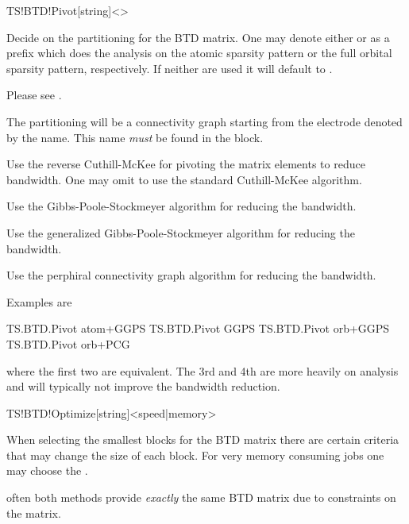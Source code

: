 \begin{fdfentry}{TS!BTD!Pivot}[string]<>

  Decide on the partitioning for the BTD matrix. One may denote either
   or  as a prefix which does the analysis on
  the atomic sparsity pattern or the full orbital sparsity pattern,
  respectively. If neither are used it will default to .

  Please see .

  \begin{fdfoptions}

    The partitioning will be a connectivity graph starting from the
    electrode denoted by the name. This name \emph{must} be found in
    the  block. 

    \option[rev-CM] %
    Use the reverse Cuthill-McKee for pivoting the matrix elements to
    reduce bandwidth. One may omit  to use the standard
    Cuthill-McKee algorithm.

    \option[GPS] %
    Use the Gibbs-Poole-Stockmeyer algorithm for reducing the
    bandwidth.

    \option[GGPS] %
    Use the generalized Gibbs-Poole-Stockmeyer algorithm for reducing
    the bandwidth.

    \option[PCG] %
    Use the perphiral connectivity graph algorithm for reducing the
    bandwidth.

  \end{fdfoptions}

  Examples are
  \begin{fdfexample}
    TS.BTD.Pivot atom+GGPS
    TS.BTD.Pivot GGPS
    TS.BTD.Pivot orb+GGPS
    TS.BTD.Pivot orb+PCG
  \end{fdfexample}
  where the first two are equivalent. The 3rd and 4th are more heavily
  on analysis and will typically not improve the bandwidth reduction.
  
\end{fdfentry}

\begin{fdfentry}{TS!BTD!Optimize}[string]<speed|memory>

  When selecting the smallest blocks for the BTD matrix there are
  certain criteria that may change the size of each block. For very
  memory consuming jobs one may choose the . 

  \note often both methods provide \emph{exactly} the same BTD matrix
  due to constraints on the matrix.
  
\end{fdfentry}

